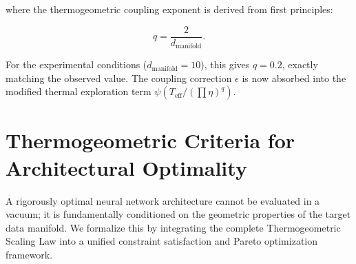 \documentclass[11pt, a4paper]{article}
\theoremstyle{definition}
\begin{document}
where the thermogeometric coupling exponent is derived from first principles:

\begin{equation}
q = \frac{2}{d_{\text{manifold}}}.
\label{eq:q_explicit}
\end{equation}

For the experimental conditions ($d_{\text{manifold}} = 10$), this gives $q = 0.2$, exactly matching the observed value. The coupling correction $\epsilon$ is now absorbed into the modified thermal exploration term $\psi(T_{\text{eff}} / (\prod\eta)^q)$.

\section{Thermogeometric Criteria for Architectural Optimality}
\label{sec:architectural_optimality}

A rigorously optimal neural network architecture cannot be evaluated in a vacuum; it is fundamentally conditioned on the geometric properties of the target data manifold. We formalize this by integrating the complete Thermogeometric Scaling Law into a unified constraint satisfaction and Pareto optimization framework.
\end{document}
